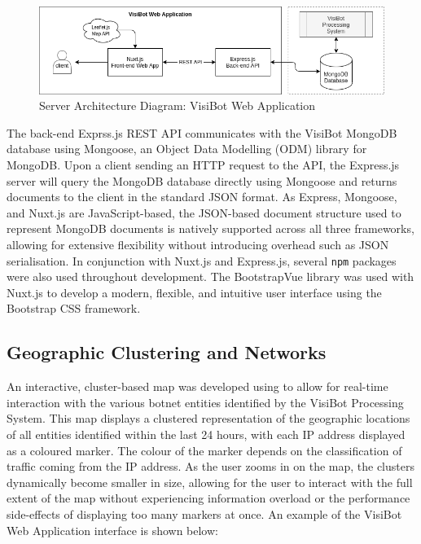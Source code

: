 \begin{figure}[!htb]
    \centering
    \includegraphics[width=0.75\linewidth]{flowcharts/frontend_flow_diagram.png}
    \caption{Server Architecture Diagram: VisiBot Web Application}
    \label{fig:frontend_server_architecture} 
\end{figure}

The back-end Exprss.js REST API communicates with the VisiBot MongoDB database using Mongoose, an Object Data Modelling (ODM) library for MongoDB. \citep{Mongoose} Upon a client sending an HTTP request to the API, the Express.js server will query the MongoDB database directly using Mongoose and returns documents to the client in the standard JSON format. As Express, Mongoose, and Nuxt.js are JavaScript-based, the JSON-based document structure used to represent MongoDB documents is natively supported across all three frameworks, allowing for extensive flexibility without introducing overhead such as JSON serialisation. In conjunction with Nuxt.js and Express.js, several \texttt{npm} packages were also used throughout development. The BootstrapVue \citep{BootstrapVue} library was used with Nuxt.js to develop a modern, flexible, and intuitive user interface using the Bootstrap CSS framework.

\subsection{Geographic Clustering and Networks}

An interactive, cluster-based map was developed using \citep{LeafletJS} to allow for real-time interaction with the various botnet entities identified by the VisiBot Processing System. This map displays a clustered representation of the geographic locations of all entities identified within the last 24 hours, with each IP address displayed as a coloured marker. The colour of the marker depends on the classification of traffic coming from the IP address. As the user zooms in on the map, the clusters dynamically become smaller in size, allowing for the user to interact with the full extent of the map without experiencing information overload or the performance side-effects of displaying too many markers at once. An example of the VisiBot Web Application interface is shown below:

